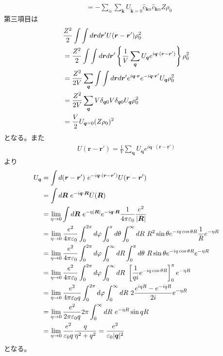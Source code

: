 \documentclass[dvipdfmx, 11pt, a4paper]{jsarticle}
\theoremstyle{definition}
\numberwithin{equation}{section}
\begin{document}
\begin{derivationBox}
\begin{align}
            &= -\sum_\alpha \sum_{\bm{k}}    U_{\bm{\tilde{k}}=0} \hat{c}_{\bm{k}\alpha} \hat{c}_{\bm{k}\alpha}Z\rho_0 
        \end{align}
        第三項目は
        \begin{align}
            &\frac{Z^2}{2} \int \int d\bm{r} d\bm{r}' U(\bm{r}-\bm{r}')\rho_0^2 \notag \\
            &=\frac{Z^2}{2} \int \int d\bm{r} d\bm{r}' \left\{ \frac{1}{V}\sum_{\bm{q}}U_{\bm{q}}e^{i\bm{q}\cdot (\bm{r}-\bm{r}')} \right\}\rho_0^2 \notag \\
            &=\frac{Z^2}{2V}\sum_{\bm{q}} \int \int d\bm{r} d\bm{r}' e^{i\bm{q}\cdot \bm{r}} e^{-i\bm{q}\cdot \bm{r}'}U_{\bm{q}} \rho_0^2 \notag \\
            &=\frac{Z^2}{2V}\sum_{\bm{q}}  V\delta_{\bm{q}0} V\delta_{\bm{q}0}U_{\bm{q}} \rho_0^2 \notag \\
            &=\frac{V}{2}U_{\bm{q}=0} (Z\rho_0)^2
        \end{align}
        となる。また
        \begin{align}
            U(\bm{r}-\bm{r}') = \frac{1}{V}\sum_{\bm{q}}U_{\bm{q}}e^{i\bm{q}\cdot (\bm{r}-\bm{r}')}
        \end{align}
        より
        \begin{align}
            U_{\bm{q}} &= \int d(\bm{r}-\bm{r}')\  e^{-i\bm{q}\cdot (\bm{r}-\bm{r}')} U(\bm{r}-\bm{r}') \notag \\
            &= \int d\bm{R}\ e^{-i\bm{q}\cdot \bm{R}} U(\bm{R}) \notag \\
            &= \lim_{\eta \to 0}\int d\bm{R}\ e^{-\eta |\bm{R}|}e^{-i\bm{q}\cdot \bm{R}} \frac{1}{4\pi\varepsilon_0} \frac{e^2}{|\bm{R}|} \notag \\
            &= \lim_{\eta \to 0}\frac{e^2}{4\pi\varepsilon_0}\int_0^{2\pi} d\varphi \int_{0}^{\pi}d\theta\int_0^{\infty} dR\ R^2 \sin \theta  e^{-iq\cos \theta R} \frac{1}{R}e^{-\eta R} \notag \\
            &= \lim_{\eta \to 0}\frac{e^2}{4\pi\varepsilon_0}\int_0^{2\pi} d\varphi \int_0^{\infty} dR\int_{0}^{\pi}d\theta\ R \sin \theta  e^{-iq\cos \theta R} e^{-\eta R}\notag \\
            &= \lim_{\eta \to 0}\frac{e^2}{4\pi\varepsilon_0}\int_0^{2\pi} d\varphi \int_0^{\infty} dR\ \left[  \frac{1}{qi} e^{-iq\cos \theta R} \right]_0^\pi e^{-\eta R} \notag \\
            &= \lim_{\eta \to 0}\frac{e^2}{4\pi\varepsilon_0q}\int_0^{2\pi} d\varphi \int_0^{\infty} dR\ 2 \frac{e^{iq R} - e^{-iq R} }{2i}e^{-\eta R}\notag \\
            &= \lim_{\eta \to 0}\frac{e^2}{2\pi\varepsilon_0q}2\pi \int_0^{\infty} dR\ e^{-\eta R}\sin qR\notag \\
            &= \lim_{\eta \to 0}\frac{e^2}{\varepsilon_0q} \frac{q}{\eta^2 + q^2} = \frac{e^2}{\varepsilon_0 |\bm{q}|^2}
        \end{align}
        となる。
    \end{derivationBox}
\end{document}
